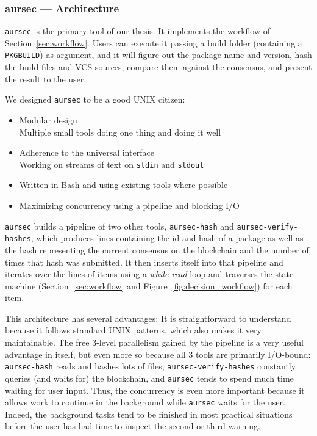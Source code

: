 \subsubsection{aursec --- Architecture}
\texttt{aursec} is the primary tool of our thesis. It implements the workflow of Section~\ref{sec:workflow}. Users can execute it passing a build folder (containing a \texttt{PKGBUILD}) as argument, and it will figure out the package name and version, hash the build files and VCS sources, compare them against the consensus, and present the result to the user.

We designed \texttt{aursec} to be a good UNIX citizen:

\begin{itemize}
\item Modular design \\ Multiple small tools doing one thing and doing it well
\item Adherence to the universal interface \cite{Salus:1994} \\
  Working on streams of text on \texttt{stdin} and \texttt{stdout}
\item Written in Bash and using existing tools where possible
\item Maximizing concurrency using a pipeline and blocking I/O
\end{itemize}

\texttt{aursec} builds a pipeline of two other tools, \texttt{aursec-hash} and \texttt{aursec-verify-hashes}, which produces lines containing the id and hash of a package as well as the hash representing the current consensus on the blockchain and the number of times that hash was submitted.
It then inserts itself into that pipeline and iterates over the lines of items using a \emph{while-read} loop and traverses the state machine (Section~\ref{sec:workflow} and Figure~\ref{fig:decision_workflow}) for each item.

This architecture has several advantages: It is straightforward to understand because it follows standard UNIX patterns, which also makes it very maintainable.
The free 3-level parallelism gained by the pipeline is a very useful advantage in itself, but even more so because all 3 tools are primarily I/O-bound: \texttt{aursec-hash} reads and hashes lots of files, \texttt{aursec-verify-hashes} constantly queries (and waits for) the blockchain, and \texttt{aursec} tends to spend much time waiting for user input.
Thus, the concurrency is even more important because it allows work to continue in the background while \texttt{aursec} waits for the user. Indeed, the background tasks tend to be finished in most practical situations before the user has had time to inspect the second or third warning. %

